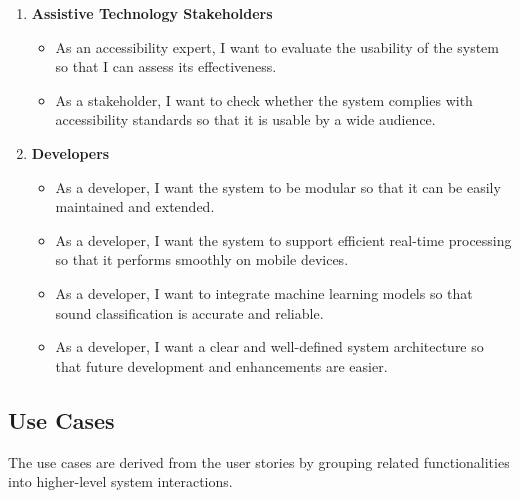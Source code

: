 \begin{enumerate}[leftmargin=80pt]
\item \textbf{Assistive Technology Stakeholders}
\begin{itemize}
    \item As an accessibility expert, I want to evaluate the usability of the system so that I can assess its effectiveness.
    \item As a stakeholder, I want to check whether the system complies with accessibility standards so that it is usable by a wide audience.
\end{itemize}

\item \textbf{Developers}
\begin{itemize}
    \item As a developer, I want the system to be modular so that it can be easily maintained and extended.
    \item As a developer, I want the system to support efficient real-time processing so that it performs smoothly on mobile devices.
    \item As a developer, I want to integrate machine learning models so that sound classification is accurate and reliable.
    \item As a developer, I want a clear and well-defined system architecture so that future development and enhancements are easier.
\end{itemize}

\end{enumerate}

\subsection{Use Cases}

The use cases are derived from the user stories by grouping related functionalities into higher-level system interactions.


